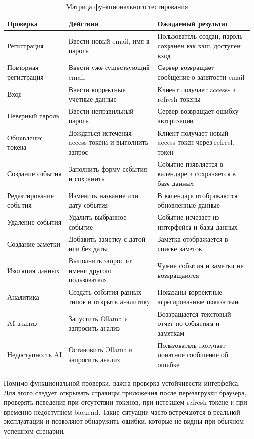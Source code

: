 \documentclass[14pt,a4paper]{extreport}
\begin{document}
\begin{longtable}{|p{}|p{}|p{}|}
\caption{Матрица функционального тестирования}\\
\hline
\textbf{Проверка} & \textbf{Действия} & \textbf{Ожидаемый результат}\\
\hline
Регистрация & Ввести новый email, имя и пароль & Пользователь создан, пароль сохранен как хэш, доступен вход\\
\hline
Повторная регистрация & Ввести уже существующий email & Сервер возвращает сообщение о занятости email\\
\hline
Вход & Ввести корректные учетные данные & Клиент получает access- и refresh-токены\\
\hline
Неверный пароль & Ввести неправильный пароль & Сервер возвращает ошибку авторизации\\
\hline
Обновление токена & Дождаться истечения access-токена и выполнить запрос & Клиент получает новый access-токен через refresh-токен\\
\hline
Создание события & Заполнить форму события и сохранить & Событие появляется в календаре и сохраняется в базе данных\\
\hline
Редактирование события & Изменить название или дату события & В календаре отображаются обновленные данные\\
\hline
Удаление события & Удалить выбранное событие & Событие исчезает из интерфейса и базы данных\\
\hline
Создание заметки & Добавить заметку с датой или без даты & Заметка отображается в списке заметок\\
\hline
Изоляция данных & Выполнить запрос от имени другого пользователя & Чужие события и заметки не возвращаются\\
\hline
Аналитика & Создать события разных типов и открыть аналитику & Показаны корректные агрегированные показатели\\
\hline
AI-анализ & Запустить Ollama и запросить анализ & Возвращается текстовый отчет по событиям и заметкам\\
\hline
Недоступность AI & Остановить Ollama и запросить анализ & Пользователь получает понятное сообщение об ошибке\\
\hline
\end{longtable}

Помимо функциональной проверки, важна проверка устойчивости интерфейса. Для этого следует открывать страницы приложения после перезагрузки браузера, проверять поведение при отсутствии токенов, при истекшем refresh-токене и при временно недоступном backend. Такие ситуации часто встречаются в реальной эксплуатации и позволяют обнаружить ошибки, которые не видны при обычном успешном сценарии.
\end{document}
